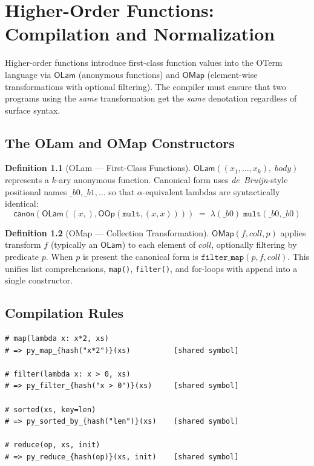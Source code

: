 \documentclass[11pt,a4paper]{report}
\theoremstyle{definition}
\newtheorem{definition}{Definition}[chapter]
\theoremstyle{plain}
\begin{document}
\chapter{Higher-Order Functions: Compilation and Normalization}
\label{ch:hof-practice}

Higher-order functions introduce first-class function values into the
OTerm language via $\mathsf{OLam}$ (anonymous functions) and
$\mathsf{OMap}$ (element-wise transformations with optional filtering).
The compiler must ensure that two programs using the \emph{same}
transformation get the \emph{same} denotation regardless of surface syntax.

\section{The OLam and OMap Constructors}

\begin{definition}[OLam --- First-Class Functions]
$\mathsf{OLam}((\mathit{x}_1, \ldots, \mathit{x}_k),\; \mathit{body})$
represents a $k$-ary anonymous function.  Canonical form uses
\emph{de~Bruijn}-style positional names $\_b0, \_b1, \ldots$ so that
$\alpha$-equivalent lambdas are syntactically identical:
\[
  \mathsf{canon}(\mathsf{OLam}((x,), \mathsf{OOp}(\texttt{mult}, (x, x))))
  \;=\; \lambda(\_b0)\;\texttt{mult}(\_b0, \_b0)
\]
\end{definition}

\begin{definition}[OMap --- Collection Transformation]
$\mathsf{OMap}(f, \mathit{coll}, p)$ applies transform $f$ (typically
an $\mathsf{OLam}$) to each element of $\mathit{coll}$, optionally
filtering by predicate $p$.  When $p$ is present the canonical form is
$\texttt{filter\_map}(p, f, \mathit{coll})$.  This unifies list
comprehensions, \texttt{map()}, \texttt{filter()}, and for-loops with
append into a single constructor.
\end{definition}

\section{Compilation Rules}

\begin{lstlisting}[caption={HOF compilation}]
# map(lambda x: x*2, xs)
# => py_map_{hash("x*2")}(xs)          [shared symbol]

# filter(lambda x: x > 0, xs)
# => py_filter_{hash("x > 0")}(xs)     [shared symbol]

# sorted(xs, key=len)
# => py_sorted_by_{hash("len")}(xs)    [shared symbol]

# reduce(op, xs, init)
# => py_reduce_{hash(op)}(xs, init)    [shared symbol]
\end{lstlisting}
\end{document}
